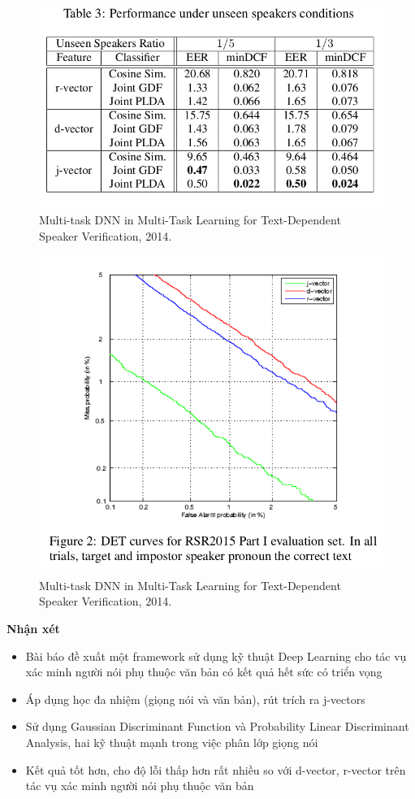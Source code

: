\documentclass{article}
\begin{document}
	\begin{figure}[H]
		\centering
		\includegraphics[width=0.75\linewidth]{images/j-vectors-result-table-03.png}
		\caption{Multi-task DNN in Multi-Task Learning for Text-Dependent Speaker Verification, 2014.}
		\label{fig:writing-thesis}
	\end{figure}
	\begin{figure}[H]
		\centering
		\includegraphics[width=0.75\linewidth]{images/j-vectors-fig-2.png}
		\caption{Multi-task DNN in Multi-Task Learning for Text-Dependent Speaker Verification, 2014.}
		\label{fig:writing-thesis}
	\end{figure}
	
	\textbf{Nhận xét}
	\begin{itemize}
		\item Bài báo đề xuất một framework sử dụng kỹ thuật Deep Learning cho tác vụ xác minh người nói phụ thuộc văn bản có kết quả hết sức có triển vọng
		\item Áp dụng học đa nhiệm (giọng nói và văn bản), rút trích ra j-vectors
		\item Sử dụng Gaussian Discriminant Function và Probability Linear Discriminant Analysis, hai kỹ thuật mạnh trong việc phân lớp giọng nói
		\item Kết quả tốt hơn, cho độ lỗi thấp hơn rất nhiều so với d-vector, r-vector trên tác vụ xác minh người nói phụ thuộc văn bản
	\end{itemize}
	
\end{document}
